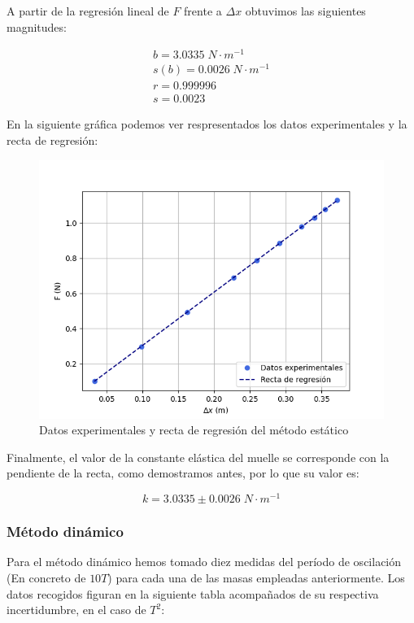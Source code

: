 \documentclass[a4paper,12pt,titlepage]{report}
\begin{document}
A partir de la regresión lineal de $F$ frente a $\Delta x$ obtuvimos las siguientes magnitudes:

\begin{equation}
    \begin{gathered}
        b =  3.0335 \; N \cdot m^{-1} \\
        s(b) = 0.0026 \; N \cdot m^{-1} \\
        r =  0.999996 \\
        s =  0.0023
    \end{gathered}
\end{equation}

En la siguiente gráfica podemos ver respresentados los datos experimentales y la recta de regresión:

\newpage

\begin{figure}[h!]
    \centering
    \includegraphics[width=0.75\linewidth]{Images/RegEstatico.png}
    \caption{Datos experimentales y recta de regresión del método estático}
\end{figure}

Finalmente, el valor de la constante elástica del muelle se corresponde con la pendiente de la recta, como demostramos antes, por lo que su valor es:

\begin{equation}
    k = 3.0335 \pm 0.0026 \; N \cdot m^{-1}
\end{equation}

\subsubsection{Método dinámico}

Para el método dinámico hemos tomado diez medidas del período de oscilación (En concreto de $10T$) para cada una de las masas empleadas anteriormente. Los datos recogidos figuran en la siguiente tabla acompañados de su respectiva incertidumbre, en el caso de $T^2$:
\end{document}
